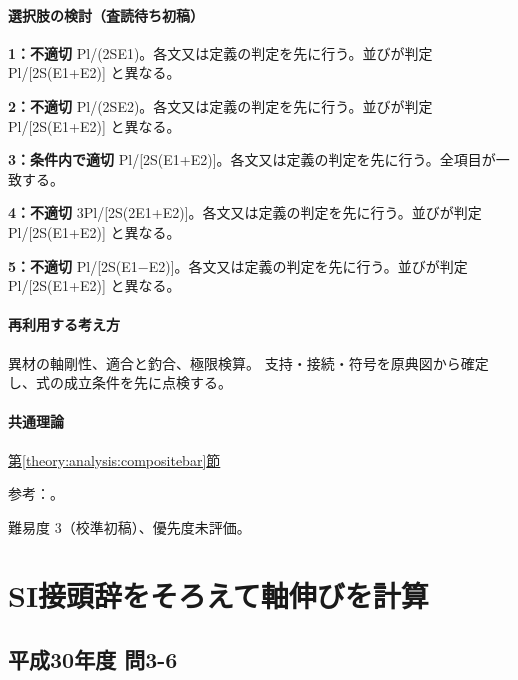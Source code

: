 \paragraph{選択肢の検討（査読待ち初稿）}\mbox{}\par

\noindent\textbf{1：不適切} Pl/(2SE1)。各文又は定義の判定を先に行う。並びが判定 Pl/[2S(E1+E2)] と異なる。\par

\noindent\textbf{2：不適切} Pl/(2SE2)。各文又は定義の判定を先に行う。並びが判定 Pl/[2S(E1+E2)] と異なる。\par

\noindent\textbf{3：条件内で適切} Pl/[2S(E1+E2)]。各文又は定義の判定を先に行う。全項目が一致する。\par

\noindent\textbf{4：不適切} 3Pl/[2S(2E1+E2)]。各文又は定義の判定を先に行う。並びが判定 Pl/[2S(E1+E2)] と異なる。\par

\noindent\textbf{5：不適切} Pl/[2S(E1−E2)]。各文又は定義の判定を先に行う。並びが判定 Pl/[2S(E1+E2)] と異なる。\par

\paragraph{再利用する考え方} 異材の軸剛性、適合と釣合、極限検算。 支持・接続・符号を原典図から確定し、式の成立条件を先に点検する。

\paragraph{共通理論} \hyperref[theory:analysis:compositebar]{第\ref*{theory:analysis:compositebar}節}

\par 参考：\cite{mit_material_elastic2000}。

\par 難易度 3（校準初稿）、優先度未評価。

\section{SI接頭辞をそろえて軸伸びを計算}

\subsection{平成30年度 問3-6}
\label{q:h30-reg-basic-3-6}

